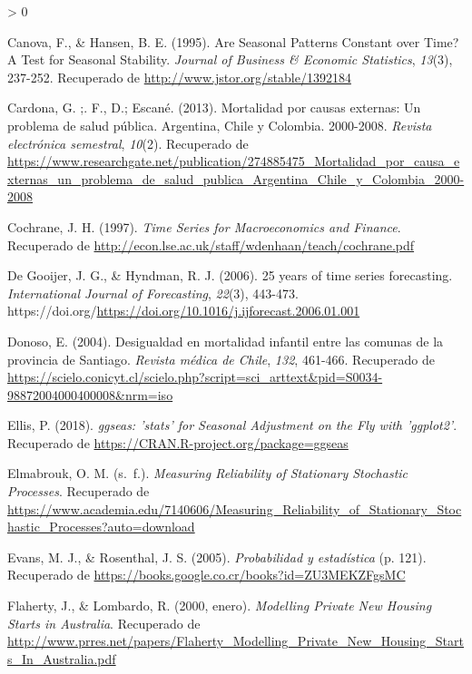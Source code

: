 \documentclass[
]{article}
\newlength{\cslhangindent}
\newenvironment{CSLReferences}[2] %
 {%
  \setlength{\parindent}{0pt}
  \ifodd #1 \everypar{\setlength{\hangindent}{\cslhangindent}}\ignorespaces\fi
  \ifnum #2 > 0
  \setlength{\parskip}{#2\baselineskip}
  \fi
 }%
 {}
\begin{document}
\begin{CSLReferences}{1}{0}
\leavevmode\hypertarget{ref-10.2307ux2f1392184}{}%
Canova, F., \& Hansen, B. E. (1995). Are Seasonal Patterns Constant over
Time? A Test for Seasonal Stability. \emph{Journal of Business \&
Economic Statistics}, \emph{13}(3), 237-252. Recuperado de
\url{http://www.jstor.org/stable/1392184}

\leavevmode\hypertarget{ref-ccpexternas}{}%
Cardona, G. ;. F., D.; Escané. (2013). Mortalidad por causas externas:
Un problema de salud pública. Argentina, Chile y Colombia. 2000-2008.
\emph{Revista electrónica semestral}, \emph{10}(2). Recuperado de
\url{https://www.researchgate.net/publication/274885475_Mortalidad_por_causa_externas_un_problema_de_salud_publica_Argentina_Chile_y_Colombia_2000-2008}

\leavevmode\hypertarget{ref-Cochrane}{}%
Cochrane, J. H. (1997). \emph{Time Series for Macroeconomics and
Finance}. Recuperado de
\url{http://econ.lse.ac.uk/staff/wdenhaan/teach/cochrane.pdf}

\leavevmode\hypertarget{ref-tsa_decades}{}%
De Gooijer, J. G., \& Hyndman, R. J. (2006). 25 years of time series
forecasting. \emph{International Journal of Forecasting}, \emph{22}(3),
443-473.
https://doi.org/\url{https://doi.org/10.1016/j.ijforecast.2006.01.001}

\leavevmode\hypertarget{ref-donoso}{}%
Donoso, E. (2004). Desigualdad en mortalidad infantil entre las comunas
de la provincia de Santiago. \emph{Revista médica de Chile}, \emph{132},
461-466. Recuperado de
\url{https://scielo.conicyt.cl/scielo.php?script=sci_arttext\&pid=S0034-98872004000400008\&nrm=iso}

\leavevmode\hypertarget{ref-ggseas}{}%
Ellis, P. (2018). \emph{ggseas: 'stats' for Seasonal Adjustment on the
Fly with 'ggplot2'}. Recuperado de
\url{https://CRAN.R-project.org/package=ggseas}

\leavevmode\hypertarget{ref-definicion_estocastico}{}%
Elmabrouk, O. M. (s.~f.). \emph{Measuring Reliability of Stationary
Stochastic Processes}. Recuperado de
\url{https://www.academia.edu/7140606/Measuring_Reliability_of_Stationary_Stochastic_Processes?auto=download}

\leavevmode\hypertarget{ref-definicion_iid}{}%
Evans, M. J., \& Rosenthal, J. S. (2005). \emph{Probabilidad y
estadística} (p. 121). Recuperado de
\url{https://books.google.co.cr/books?id=ZU3MEKZFgsMC}

\leavevmode\hypertarget{ref-Lombardo}{}%
Flaherty, J., \& Lombardo, R. (2000, enero). \emph{Modelling Private New
Housing Starts in Australia}. Recuperado de
\url{http://www.prres.net/papers/Flaherty_Modelling_Private_New_Housing_Starts_In_Australia.pdf}


\end{CSLReferences}
\end{document}
